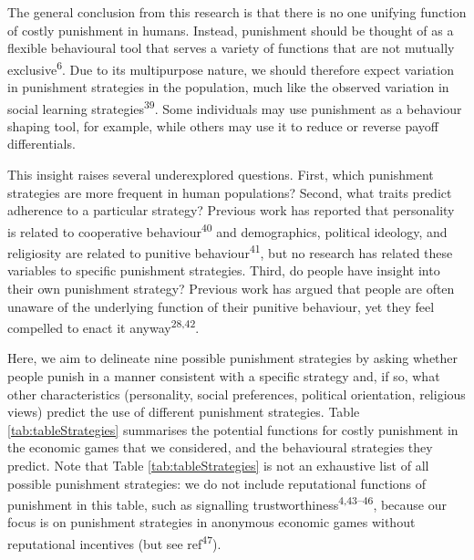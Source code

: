 \documentclass[
  man,floatsintext]{apa6}
\begin{document}
The general conclusion from this research is that there is no one unifying
function of costly punishment in humans. Instead, punishment should be thought
of as a flexible behavioural tool that serves a variety of functions that are
not mutually exclusive\textsuperscript{6}. Due to its multipurpose nature, we should
therefore expect variation in punishment strategies in the population, much like
the observed variation in social learning strategies\textsuperscript{39}. Some
individuals may use punishment as a behaviour shaping tool, for example, while
others may use it to reduce or reverse payoff differentials.

This insight raises several underexplored questions. First, which punishment
strategies are more frequent in human populations? Second, what traits predict
adherence to a particular strategy? Previous work has reported that personality
is related to cooperative behaviour\textsuperscript{40} and demographics, political
ideology, and religiosity are related to punitive behaviour\textsuperscript{41}, but
no research has related these variables to specific punishment strategies.
Third, do people have insight into their own punishment strategy? Previous work
has argued that people are often unaware of the underlying function of their
punitive behaviour, yet they feel compelled to enact it anyway\textsuperscript{28,42}.

Here, we aim to delineate nine possible punishment strategies by asking
whether people punish in a manner consistent with a specific strategy and, if
so, what other characteristics (personality, social preferences, political
orientation, religious views) predict the use of different punishment strategies.
Table \ref{tab:tableStrategies} summarises the potential functions for costly
punishment in the economic games that we considered, and the behavioural
strategies they predict. Note that Table \ref{tab:tableStrategies} is not
an exhaustive list of all possible punishment strategies: we do not include
reputational functions of punishment in this table, such as signalling
trustworthiness\textsuperscript{4,43--46},
because our focus is on punishment strategies in anonymous economic games without
reputational incentives (but see ref\textsuperscript{47}).
\end{document}
